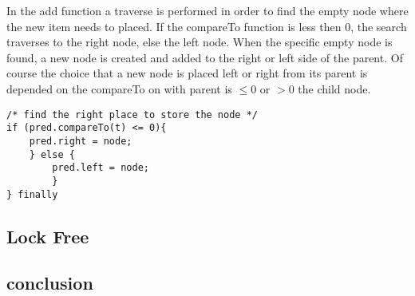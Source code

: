 \documentclass[10pt,a4paper]{article}
\begin{document}
In the add function a traverse is performed in order to find the empty node where the new item needs to placed. If the compareTo function is less then 0, the search traverses to the right node, else the left node. When the specific empty node is found, a new node is created and added to the right or left side of the parent. Of course the choice that a new node is placed left or right from its parent is depended on the compareTo on with parent is \texttt{$\leq 0$} or \texttt{$> 0$} the child node. 


\begin{lstlisting}
/* find the right place to store the node */
if (pred.compareTo(t) <= 0){
	pred.right = node;
	} else {	
		pred.left = node;
		}
} finally
\end{lstlisting}



\subsection{Lock Free}

\subsection{conclusion}
\end{document}
